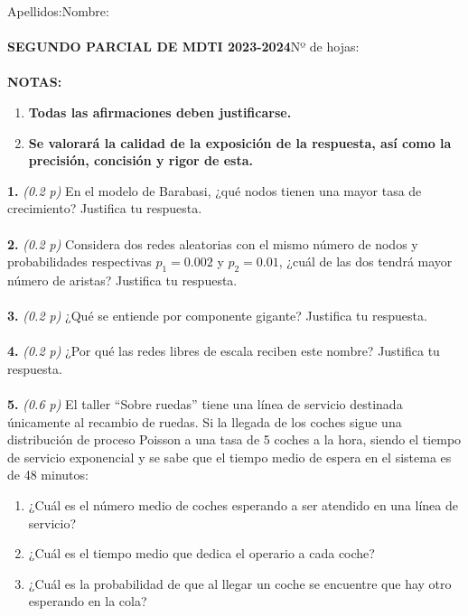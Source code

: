 \documentclass{article}
\title{\vspace{-6cm}}
\date{}
\begin{document}
\maketitle
Apellidos:\hspace{11cm}Nombre:\\\\
\hspace*{4cm}\textbf{SEGUNDO PARCIAL DE MDTI 2023-2024}\hspace*{3cm}Nº de hojas:\\\\

\textbf{NOTAS:}
\begin{enumerate}
    \item\textbf{Todas las afirmaciones deben justificarse.}
    \item\textbf{Se valorará la calidad de la exposición de la respuesta, así como la precisión, concisión y rigor de esta.}
\end{enumerate}

\vspace{0.2cm}

\textbf{1.} \textit{(0.2 p)} En el modelo de Barabasi, ¿qué nodos tienen una mayor tasa de crecimiento? Justifica tu respuesta.\\\\
\textbf{2.} \textit{(0.2 p)} Considera dos redes aleatorias con el mismo número de nodos y probabilidades respectivas $p_1=0.002$ y $p_2=0.01$, ¿cuál de las dos tendrá mayor número de aristas? Justifica tu respuesta.\\\\
\textbf{3.} \textit{(0.2 p)} ¿Qué se entiende por componente gigante? Justifica tu respuesta.\\\\
\textbf{4.} \textit{(0.2 p)} ¿Por qué las redes libres de escala reciben este nombre? Justifica tu respuesta.\\\\
\textbf{5.} \textit{(0.6 p)} El taller ``Sobre ruedas'' tiene una línea de servicio destinada únicamente al recambio de ruedas. Si la llegada de los coches sigue una distribución de proceso Poisson a una tasa de 5 coches a la hora, siendo el tiempo de servicio exponencial y se sabe que el tiempo medio de espera en el sistema es de 48 minutos:
\begin{enumerate}
    \item ¿Cuál es el número medio de coches esperando a ser atendido en una línea de servicio?
    \item ¿Cuál es el tiempo medio que dedica el operario a cada coche?
    \item ¿Cuál es la probabilidad de que al llegar un coche se encuentre que hay otro esperando en la cola?
\end{enumerate}
\end{document}
